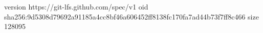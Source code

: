 version https://git-lfs.github.com/spec/v1
oid sha256:9d5308d79692a91185a4cc8bf46a606452ff8138fc170fa7ad44b73f7ff8c466
size 128095

